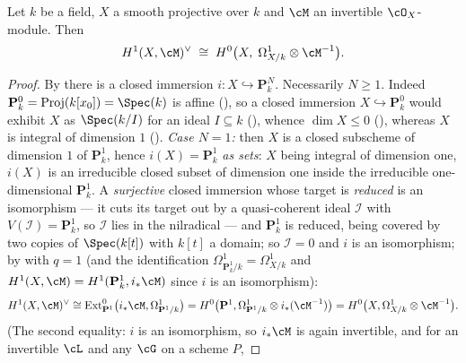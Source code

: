 \begin{theorem}
\label{thm:pc-serre-duality-curve}
Let $k$ be a field, $X$ a smooth projective
 over $k$ and $\cM$ an invertible
$\cO_X$-module.  Then
\[
H^1(X,\cM)^{\vee}\;\cong\;H^0\bigl(X,\;\Omega^1_{X/k}\otimes\cM^{-1}\bigr).
\]
\end{theorem}
\begin{proof}
By  there is a closed immersion
$i:X\hookrightarrow\mathbf P^N_k$.  Necessarily $N\ge1$.  Indeed
$\mathbf P^0_k=\operatorname{Proj}(k[x_0])=\Spec(k)$ is affine
(), so a closed
immersion $X\hookrightarrow\mathbf P^0_k$ would exhibit $X$ as
$\Spec(k/I)$ for an ideal $I\subseteq k$
(), whence $\dim X\le0$
(), whereas $X$ is integral of dimension $1$
().
\emph{Case $N=1$:} then $X$ is a
closed subscheme of dimension $1$ of $\mathbf P^1_k$, hence
$i(X)=\mathbf P^1_k$ \emph{as sets}: $X$ being integral of dimension
one, $i(X)$ is an irreducible closed subset of
dimension one inside the irreducible one-dimensional $\mathbf P^1_k$.  A
\emph{surjective} closed immersion whose target is \emph{reduced} is an
isomorphism --- it cuts its target out by a quasi-coherent ideal
$\mathcal I$ with $V(\mathcal I)=\mathbf P^1_k$, so $\mathcal I$ lies in
the nilradical --- and $\mathbf P^1_k$ is reduced, being covered by two
copies of $\Spec(k[t])$ with $k[t]$ a domain; so $\mathcal I=0$ and $i$
is an isomorphism; by
 with $q=1$ (and the identification
$\Omega^1_{\mathbf P^1_k/k}=\Omega^1_{X/k}$ and
$H^1(X,\cM)=H^1(\mathbf P^1_k,i_*\cM)$ since $i$ is an
isomorphism):
\[
H^1(X,\cM)^{\vee}\cong
\operatorname{Ext}^0_{\mathbf P^1}\bigl(i_*\cM,\Omega^1_{\mathbf P^1/k}\bigr)
=H^0\bigl(\mathbf P^1,\Omega^1_{\mathbf P^1/k}\otimes i_*(\cM^{-1})\bigr)
=H^0\bigl(X,\Omega^1_{X/k}\otimes\cM^{-1}\bigr).
\]
(The second equality: $i$ is an isomorphism, so $i_*\cM$ is again
invertible, and for an invertible $\cL$ and any $\cG$ on a scheme $P$,

\end{proof}
